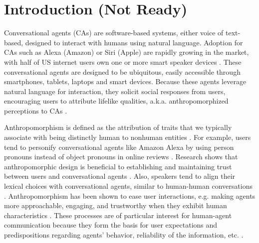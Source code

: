 \documentclass[sigconf,screen,review, anonymous]{acmart}
\begin{document}



\maketitle

\section{Introduction (Not Ready)}

Conversational agents (CAs) are software-based systems, either voice of text-based, designed to interact with humans using natural language. Adoption for CAs such as Alexa (Amazon) or Siri (Apple) are rapidly growing in the market, with half of US internet users own one or more smart speaker devices \cite{2022comscore}. These conversational agents are designed to be ubiquitous, easily accessible through smartphones, tablets, laptops and smart devices. Because these agents leverage natural language for interaction, they solicit social responses from users, encouraging users to attribute lifelike qualities, a.k.a. anthropomorphized perceptions to CAs \cite{eyssel2012if}.

Anthropomorphism is defined as the attribution of traits that we typically associate with being distinctly human to nonhuman entities \cite{waytz2010sees}. For example, users tend to personify conversational agents like Amazon Alexa by using person pronouns instead of object pronouns in online reviews \cite{purington2017alexa}.  Research shows that anthropomorphic design is beneficial to establishing and maintaining trust between users and conversational agents \cite{seeger2021chatbots}. Also, speakers tend to align their lexical choices with conversational agents, similar to human-human conversations \cite{cowan2015does}. Anthropomorphism has been shown to ease user interactions, e.g. making agents more approachable, engaging, and trustworthy when they exhibit human characteristics \cite{qiu2009evaluating}. These processes are of particular interest for human-agent communication because they form the basis for user expectations and predispositions regarding agents' behavior, reliability of the information, etc. \cite{kuzminykh2020genie}.
\end{document}
